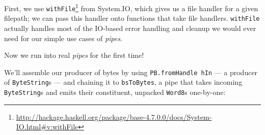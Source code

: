\documentclass[]{article}
\newenvironment{Shaded}{}{}
\newcommand{\CommentTok}[1]{\textcolor[rgb]{0.38,0.63,0.69}{\textit{#1}}}
\newcommand{\DataTypeTok}[1]{\textcolor[rgb]{0.56,0.13,0.00}{#1}}
\newcommand{\DecValTok}[1]{\textcolor[rgb]{0.25,0.63,0.44}{#1}}
\newcommand{\FunctionTok}[1]{\textcolor[rgb]{0.02,0.16,0.49}{#1}}
\newcommand{\KeywordTok}[1]{\textcolor[rgb]{0.00,0.44,0.13}{\textbf{#1}}}
\newcommand{\NormalTok}[1]{#1}
\newcommand{\OperatorTok}[1]{\textcolor[rgb]{0.40,0.40,0.40}{#1}}
\newcommand{\OtherTok}[1]{\textcolor[rgb]{0.00,0.44,0.13}{#1}}
\renewcommand{\href}[2]{#2\footnote{\url{#1}}}
\begin{document}
\begin{Shaded}
\end{Shaded}

First, we use
\href{http://hackage.haskell.org/package/base-4.7.0.0/docs/System-IO.html\#v:withFile}{\texttt{withFile}}
from System.IO, which gives us a file handler for a given filepath; we can pass
this handler onto functions that take file handlers. \texttt{withFile} actually
handles most of the IO-based error handling and cleanup we would ever need for
our simple use cases of \emph{pipes}.

Now we run into real \emph{pipes} for the first time!

We'll assemble our producer of bytes by using \texttt{PB.fromHandle\ hIn} --- a
producer of \texttt{ByteString}s --- and chaining it to \texttt{bsToBytes}, a
pipe that takes incoming \texttt{ByteString}s and emits their constituent,
unpacked \texttt{Word8}s one-by-one:
\end{document}
